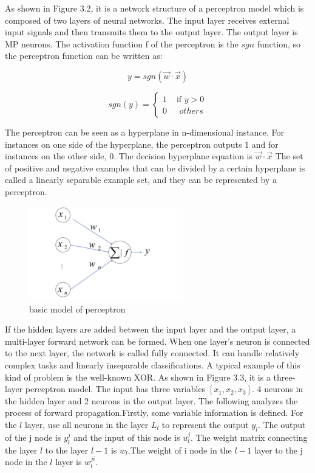 As shown in Figure 3.2, it is a network structure of a perceptron model which is composed of two layers of neural networks. 
The input layer receives external input signals and then transmits them to the output layer. 
The output layer is MP neurons. The activation function f of the perceptron is the $sgn$ function, so the perceptron function can be written as:

\begin{equation}
	y=sgn(\vec{w}\cdot \vec{x})
\end{equation}	



\begin{equation}
sgn(y)=\begin{cases}
1 & \text{ if } y>0 \\ 
0 & \text{  } others
\end{cases}
\end{equation}

\vspace{10mm}

The perceptron can be seen as a hyperplane in n-dimensional instance. For instances on one side of the hyperplane, the perceptron outputs 1 and for instances on the other side, 0. The decision hyperplane equation is $\vec{w}\cdot \vec{x}$
The set of positive and negative examples that can be divided by a certain hyperplane is called a linearly separable example set, and they can be represented by a perceptron.\\[2ex]

\begin{figure}[h]
	\centering
	\includegraphics[width=0.6\textwidth]{perceptron.png}
	\caption{basic model of perceptron}
\end{figure}


If the hidden layers are added between the input layer and the output layer, a multi-layer forward network can be formed.
When one layer's neuron is connected to the next layer,  the network is called fully connected. It can handle relatively complex tasks and linearly inseparable classifications. A typical example of this kind of problem is the well-known XOR. As shown in Figure 3.3, it is a three-layer perceptron model. The input has three variables $\left [x_{1},x_{2},x_{3}  \right ]$.
4 neurons in the hidden layer and 2 neurons in the output layer. The following analyzes the process of forward propagation.Firstly, some variable information is defined. 
For the $l$ layer, use all neurons in the layer $L_{l}$ to represent the output $y_{l}$. The output of the j node is $y_{l}^{j}$ and the input of this node is $u_{l}^{j}$. The weight matrix connecting the layer $l$ to the layer $l-1$ is $w_{l}$.The weight of i node in the $l-1$ layer to the j node in the $l$ layer is $w_{l}^{ji}$.


